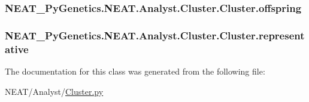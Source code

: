 \subsubsection[{\texorpdfstring{offspring}{offspring}}]{\setlength{\rightskip}{0pt plus 5cm}N\+E\+A\+T\+\_\+\+Py\+Genetics.\+N\+E\+A\+T.\+Analyst.\+Cluster.\+Cluster.\+offspring}\hypertarget{classNEAT__PyGenetics_1_1NEAT_1_1Analyst_1_1Cluster_1_1Cluster_a29316a5b5546bea6c97896e814ce084e}{}\label{classNEAT__PyGenetics_1_1NEAT_1_1Analyst_1_1Cluster_1_1Cluster_a29316a5b5546bea6c97896e814ce084e}
\subsubsection[{\texorpdfstring{representative}{representative}}]{\setlength{\rightskip}{0pt plus 5cm}N\+E\+A\+T\+\_\+\+Py\+Genetics.\+N\+E\+A\+T.\+Analyst.\+Cluster.\+Cluster.\+representative}\hypertarget{classNEAT__PyGenetics_1_1NEAT_1_1Analyst_1_1Cluster_1_1Cluster_a6d98b217b836b08679f9b20f9459f2ba}{}\label{classNEAT__PyGenetics_1_1NEAT_1_1Analyst_1_1Cluster_1_1Cluster_a6d98b217b836b08679f9b20f9459f2ba}


The documentation for this class was generated from the following file\+:\begin{DoxyCompactItemize}
\item 
N\+E\+A\+T/\+Analyst/\hyperlink{Cluster_8py}{Cluster.\+py}\end{DoxyCompactItemize}
